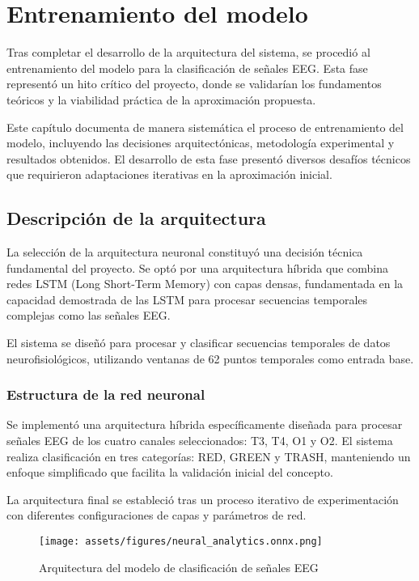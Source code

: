 \chapter{Entrenamiento del modelo}\label{ch:model_training}

Tras completar el desarrollo de la arquitectura del sistema, se procedió al entrenamiento del modelo para la clasificación de señales EEG. Esta fase representó un hito crítico del proyecto, donde se validarían los fundamentos teóricos y la viabilidad práctica de la aproximación propuesta.

Este capítulo documenta de manera sistemática el proceso de entrenamiento del modelo, incluyendo las decisiones arquitectónicas, metodología experimental y resultados obtenidos. El desarrollo de esta fase presentó diversos desafíos técnicos que requirieron adaptaciones iterativas en la aproximación inicial.

\section{Descripción de la arquitectura}

La selección de la arquitectura neuronal constituyó una decisión técnica fundamental del proyecto. Se optó por una arquitectura híbrida que combina redes LSTM (Long Short-Term Memory) con capas densas, fundamentada en la capacidad demostrada de las LSTM para procesar secuencias temporales complejas como las señales EEG. 

El sistema se diseñó para procesar y clasificar secuencias temporales de datos neurofisiológicos, utilizando ventanas de 62 puntos temporales como entrada base.

\subsection{Estructura de la red neuronal}

Se implementó una arquitectura híbrida específicamente diseñada para procesar señales EEG de los cuatro canales seleccionados: T3, T4, O1 y O2. El sistema realiza clasificación en tres categorías: RED, GREEN y TRASH, manteniendo un enfoque simplificado que facilita la validación inicial del concepto.

La arquitectura final se estableció tras un proceso iterativo de experimentación con diferentes configuraciones de capas y parámetros de red.

\begin{figure}[ht]
    \centering
    \texttt{[image: assets/figures/neural\_analytics.onnx.png]}
    \caption{Arquitectura del modelo de clasificación de señales EEG}
    \label{fig:model_architecture}
\end{figure}


